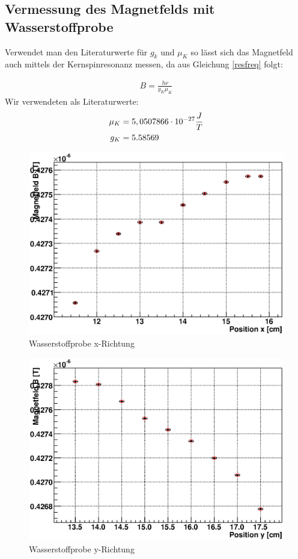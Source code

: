 \documentclass[12pt]{article}
\begin{document}
\subsection{Vermessung des Magnetfelds mit Wasserstoffprobe}
Verwendet man den Literaturwerte für $g_k$ und $\mu_K$ so lässt sich das Magnetfeld auch mittels der Kernspinresonanz messen, da aus Gleichung \ref{resfreq} folgt:

\begin{align}
 B = \frac{h \nu}{g_K \mu_K}
\end{align}
Wir verwendeten als Literaturwerte:
\begin{align}
 \notag \mu_K &= 5,0507866\cdot 10^{-27} \frac{J}{T} \\
 \notag g_K &= 5.58569
\end{align}

\begin{figure}[H]
\centering
\includegraphics[width=0.9\linewidth]{pictures/wasser_x.eps}
\caption{Wasserstoffprobe x-Richtung}
\end{figure}

\begin{figure}[H]
\centering
\includegraphics[width=0.9\linewidth]{pictures/wasser_y.eps}
\caption{Wasserstoffprobe y-Richtung}
\end{figure}
\end{document}
